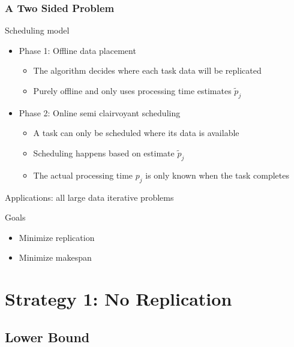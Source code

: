 \documentclass[usenames,dvipsnames]{beamer}
\begin{document}
\begin{frame}
  \frametitle{A Two Sided Problem}

  \begin{block}{Scheduling model}
    \begin{itemize}
    \item Phase 1: Offline data placement
      \begin{itemize}
      \item The algorithm decides where each task data will be
        replicated
      \item Purely offline and only uses processing time estimates $\tilde{p}_j$
      \end{itemize}
    \item Phase 2: Online semi clairvoyant scheduling
      \begin{itemize}
      \item A task can only be scheduled where its data is available
      \item Scheduling happens based on estimate $\tilde{p}_j$
      \item The actual processing time $p_j$ is only known when the task completes
      \end{itemize}
    \end{itemize}

    Applications: all large data iterative problems
  \end{block}
  
  \begin{block}{Goals}
    \begin{itemize}
    \item Minimize replication
    \item Minimize makespan
    \end{itemize}
  \end{block}
\end{frame}


\section{Strategy 1: No Replication}

\subsection{Lower Bound}
\end{document}
